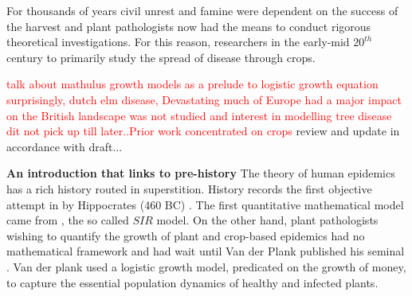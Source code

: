     For thousands of years civil unrest and famine were dependent on the success of the harvest and plant pathologists now had the means to conduct rigorous theoretical investigations. For this reason, researchers in the early-mid $20^{th}$ century to primarily study the spread of disease through crops.
    
    \textcolor{red}{talk about mathulus growth models as a prelude to logistic growth equation}
    \textcolor{red}{surprisingly, dutch elm disease, Devastating much of Europe had a major impact on the British landscape was not studied and interest in modelling tree disease dit not pick up till later..Prior work concentrated on crops}
    \textemdash review and update in accordance with draft...


\textbf{An introduction that links to pre-history}
    The theory of human epidemics has a rich history routed in superstition. History records the first objective attempt in by Hippocrates (460  BC) \cite{langholf2011medical}. The first quantitative mathematical model came from \cite{kermack-model}, the so called $SIR$ model. On the other hand, plant pathologists wishing to quantify the growth of plant and crop-based epidemics had no mathematical framework and had wait until Van der Plank published his seminal \cite{van2013plant}. Van der plank used a logistic growth model, predicated on the growth of money, to capture the essential population dynamics of healthy and infected plants.\\